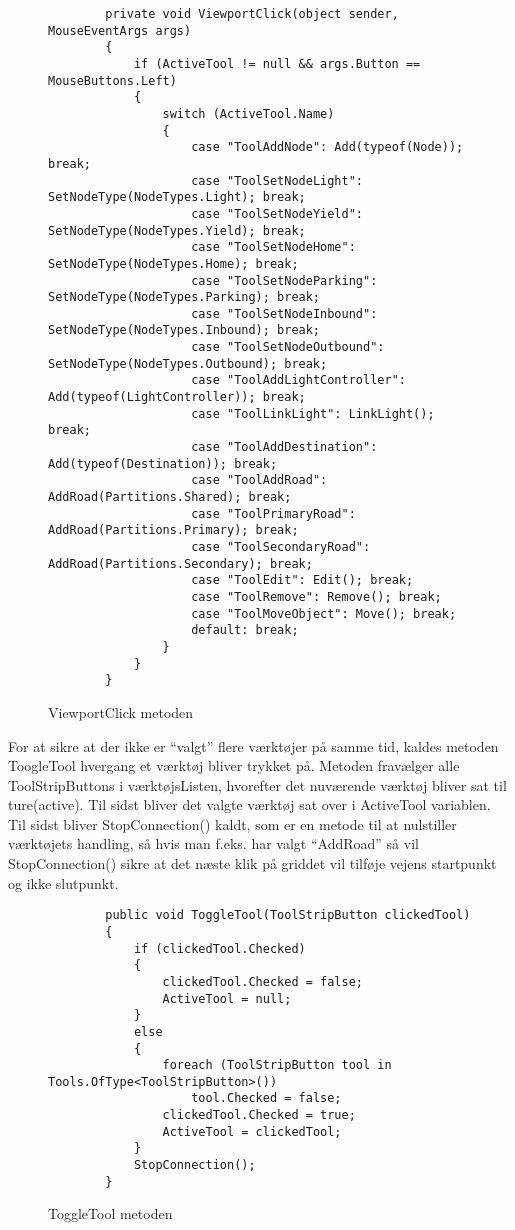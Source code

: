 \begin{figure}[H]
\begin{lstlisting}
        private void ViewportClick(object sender, MouseEventArgs args)
        {
            if (ActiveTool != null && args.Button == MouseButtons.Left)
            {
                switch (ActiveTool.Name)
                {
                    case "ToolAddNode": Add(typeof(Node)); break;
                    case "ToolSetNodeLight": SetNodeType(NodeTypes.Light); break;
                    case "ToolSetNodeYield": SetNodeType(NodeTypes.Yield); break;
                    case "ToolSetNodeHome": SetNodeType(NodeTypes.Home); break;
                    case "ToolSetNodeParking": SetNodeType(NodeTypes.Parking); break;
                    case "ToolSetNodeInbound": SetNodeType(NodeTypes.Inbound); break;
                    case "ToolSetNodeOutbound": SetNodeType(NodeTypes.Outbound); break;
                    case "ToolAddLightController": Add(typeof(LightController)); break;
                    case "ToolLinkLight": LinkLight(); break;
                    case "ToolAddDestination": Add(typeof(Destination)); break;
                    case "ToolAddRoad": AddRoad(Partitions.Shared); break;
                    case "ToolPrimaryRoad": AddRoad(Partitions.Primary); break;
                    case "ToolSecondaryRoad": AddRoad(Partitions.Secondary); break;
                    case "ToolEdit": Edit(); break;
                    case "ToolRemove": Remove(); break;
                    case "ToolMoveObject": Move(); break;
                    default: break;
                }
            }
        }
\end{lstlisting}
\caption{ViewportClick metoden}\label{ViewportClickCode}
\end{figure}

\vspace{5mm}

For at sikre at der ikke er “valgt” flere værktøjer på samme tid, kaldes metoden ToogleTool hvergang et værktøj bliver trykket på. Metoden fravælger alle ToolStripButtons i værktøjsListen, hvorefter det nuværende værktøj bliver sat til ture(active). Til sidst bliver det valgte værktøj sat over i ActiveTool variablen. Til sidst bliver StopConnection() kaldt, som er en metode til at nulstiller værktøjets handling, så hvis man f.eks. har valgt “AddRoad” så vil StopConnection() sikre at det næste klik på griddet vil tilføje vejens startpunkt og ikke slutpunkt.

\begin{figure}[H]
\begin{lstlisting}
        public void ToggleTool(ToolStripButton clickedTool)
        {
            if (clickedTool.Checked)
            {
                clickedTool.Checked = false;
                ActiveTool = null;
            }
            else
            {
                foreach (ToolStripButton tool in Tools.OfType<ToolStripButton>())
                    tool.Checked = false;
                clickedTool.Checked = true;
                ActiveTool = clickedTool;
            }
            StopConnection();
        }
\end{lstlisting}
\caption{ToggleTool metoden}\label{ToggleToolCode}
\end{figure}

